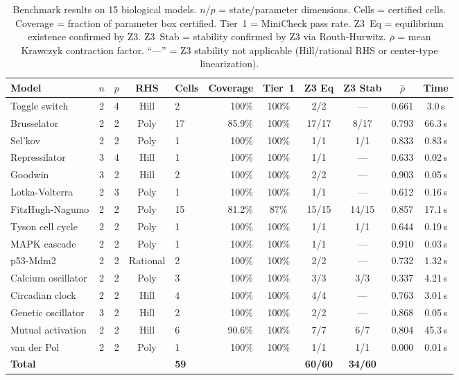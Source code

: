 \documentclass[11pt]{article}
\begin{document}
\begin{table}[t]
\centering
\caption{Benchmark results on 15 biological models. $n$/$p$ = state/parameter dimensions. Cells = certified cells. Coverage = fraction of parameter box certified. Tier~1 = MiniCheck pass rate. Z3~Eq = equilibrium existence confirmed by Z3. Z3~Stab = stability confirmed by Z3 via Routh-Hurwitz.  $\bar\rho$ = mean Krawczyk contraction factor. ``---'' = Z3 stability not applicable (Hill/rational RHS or center-type linearization).}
\label{tab:benchmarks}
\small
\begin{tabular}{@{}lccclrccccc@{}}
\toprule
Model & $n$ & $p$ & RHS & Cells & Coverage & Tier~1 & Z3 Eq & Z3 Stab & $\bar\rho$ & Time \\
\midrule
Toggle switch      & 2 & 4 & Hill     & 2  & 100\%  & 100\% & 2/2   & ---    & 0.661 & 3.0\,s \\
Brusselator        & 2 & 2 & Poly     & 17 & 85.9\% & 100\% & 17/17 & 8/17  & 0.793 & 66.3\,s \\
Sel'kov            & 2 & 2 & Poly     & 1  & 100\%  & 100\% & 1/1   & 1/1   & 0.833 & 0.83\,s \\
Repressilator      & 3 & 4 & Hill     & 1  & 100\%  & 100\% & 1/1   & ---    & 0.633 & 0.02\,s \\
Goodwin            & 3 & 2 & Hill     & 2  & 100\%  & 100\% & 2/2   & ---    & 0.903 & 0.05\,s \\
Lotka-Volterra     & 2 & 3 & Poly     & 1  & 100\%  & 100\% & 1/1   & ---    & 0.612 & 0.16\,s \\
FitzHugh-Nagumo    & 2 & 2 & Poly     & 15 & 81.2\% & 87\%  & 15/15 & 14/15 & 0.857 & 17.1\,s \\
Tyson cell cycle   & 2 & 2 & Poly     & 1  & 100\%  & 100\% & 1/1   & 1/1   & 0.644 & 0.19\,s \\
MAPK cascade       & 2 & 2 & Poly     & 1  & 100\%  & 100\% & 1/1   & ---    & 0.910 & 0.03\,s \\
p53-Mdm2           & 2 & 2 & Rational & 2  & 100\%  & 100\% & 2/2   & ---    & 0.732 & 1.32\,s \\
Calcium oscillator & 2 & 2 & Poly     & 3  & 100\%  & 100\% & 3/3   & 3/3   & 0.337 & 4.21\,s \\
Circadian clock    & 2 & 2 & Hill     & 4  & 100\%  & 100\% & 4/4   & ---    & 0.763 & 3.01\,s \\
Genetic oscillator & 3 & 2 & Hill     & 2  & 100\%  & 100\% & 2/2   & ---    & 0.868 & 0.05\,s \\
Mutual activation  & 2 & 2 & Hill     & 6  & 90.6\% & 100\% & 7/7   & 6/7   & 0.804 & 45.3\,s \\
van der Pol        & 2 & 2 & Poly     & 1  & 100\%  & 100\% & 1/1   & 1/1   & 0.000 & 0.01\,s \\
\midrule
\textbf{Total}     &   &   &          & \textbf{59} & & & \textbf{60/60} & \textbf{34/60} & & \\
\bottomrule
\end{tabular}
\end{table}
\end{document}
